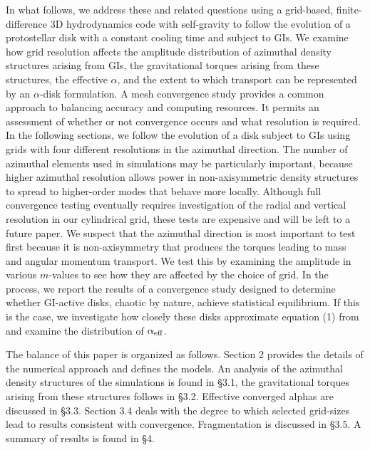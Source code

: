 \documentclass[manuscript]{aastex}
\begin{document}
In what follows, we address these and related questions using a grid-based, finite-difference 3D hydrodynamics code with 
self-gravity to follow the evolution of a protostellar disk with a constant cooling time and subject to GIs.
We examine how grid resolution affects
the amplitude distribution of azimuthal density structures arising from GIs, the gravitational torques arising from these structures,
the effective $\alpha$, and the extent to which transport can be represented by an $\alpha$-disk formulation.
A mesh convergence study 
provides a common approach to balancing accuracy and computing resources.
It permits an assessment of whether or not convergence occurs and what resolution is required.
In the following sections, we follow the evolution of a disk subject to GIs
using grids with four different
resolutions in the azimuthal direction.  The number of azimuthal elements used in simulations
may be particularly important, because higher azimuthal resolution 
allows power in non-axisymmetric density structures to spread to higher-order modes 
that behave more locally. 
Although full convergence testing eventually requires investigation of the radial and vertical resolution in our
cylindrical grid, these tests are expensive and will be left to a future paper.  We suspect that the azimuthal
direction is most important to test first because it is non-axisymmetry that produces the torques leading
to mass and angular momentum transport.
We test this by examining the amplitude in various 
$m$-values to see how they are affected by the choice of grid.
In the process, 
we report the results of a convergence study designed to determine whether GI-active disks, chaotic by nature, achieve statistical equilibrium.   If this is the case, we investigate how closely these disks approximate equation (1) from
 \citet{gammie2001} and examine the distribution of $\alpha_{\rm{eff}}$. 

The balance of this paper is organized as follows.  Section 2 provides the details of the numerical approach and defines the models.  An analysis of the azimuthal density structures of the simulations 
is found in \S3.1, the gravitational torques arising from these structures follows in \S3.2.  Effective converged alphas are 
discussed in \S3.3.  Section 3.4 deals with the degree to which selected grid-sizes lead to results consistent with
convergence.  Fragmentation is discussed in \S3.5.  A summary of results is found in \S4.
\end{document}
